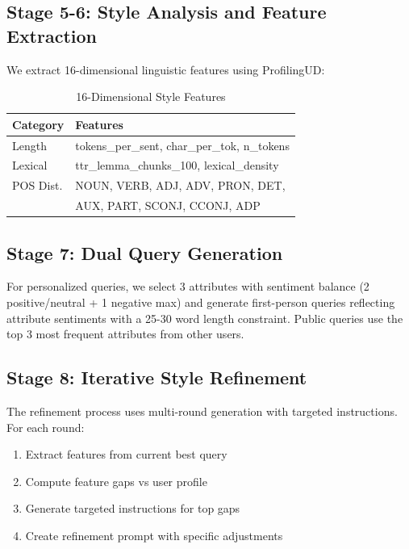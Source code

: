 \documentclass[11pt]{article}
\begin{document}
\subsection{Stage 5-6: Style Analysis and Feature Extraction}

We extract 16-dimensional linguistic features using ProfilingUD:

\begin{table}[h]
\centering
\small
\begin{tabular}{ll}
\toprule
\textbf{Category} & \textbf{Features} \\
\midrule
Length & tokens\_per\_sent, char\_per\_tok, n\_tokens \\
Lexical & ttr\_lemma\_chunks\_100, lexical\_density \\
POS Dist. & NOUN, VERB, ADJ, ADV, PRON, DET, \\
          & AUX, PART, SCONJ, CCONJ, ADP \\
\bottomrule
\end{tabular}
\caption{16-Dimensional Style Features}
\label{tab:features}
\end{table}

\subsection{Stage 7: Dual Query Generation}

For personalized queries, we select 3 attributes with sentiment balance (2 positive/neutral + 1 negative max) and generate first-person queries reflecting attribute sentiments with a 25-30 word length constraint. Public queries use the top 3 most frequent attributes from other users.

\subsection{Stage 8: Iterative Style Refinement}

The refinement process uses multi-round generation with targeted instructions. For each round:
\begin{enumerate}
    \item Extract features from current best query
    \item Compute feature gaps vs user profile
    \item Generate targeted instructions for top gaps
    \item Create refinement prompt with specific adjustments
\end{enumerate}
\end{document}
